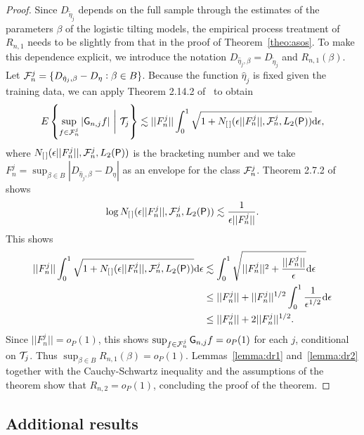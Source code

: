 \begin{proof}
  Since $D_{\tilde \eta_j}$ depends on the full sample through the
  estimates of the parameters $\beta$ of the logistic tilting models,
  the empirical process treatment of $R_{n,1}$ needs to be slightly
  from that in the proof of Theorem~\ref{theo:asos}. To make this
  dependence explicit, we introduce the notation
  $D_{\hat \eta_j,\beta}=D_{\tilde \eta_j}$ and $R_{n,1}(\beta)$. Let
  ${\cal F}_n^j=\{D_{\hat \eta_j,\beta} -
  D_\eta:\beta\in B\}$. Because the function
  $\hat\eta_j$ is fixed given the training data, we can apply Theorem
  2.14.2 of~\cite{vdvaart1996weak} to obtain
  \[E\left\{\sup_{f\in {\cal F}_n^j}|\Gnj f| \,\,\bigg|\,\, {\cal
        T}_j\right\}\lesssim ||F^j_n||\int_0^1\sqrt{1+N_{[\,]}(\epsilon
      ||F_n^j||, {\cal F}_n^j, L_2(\P))}\dd\epsilon, \] where
  $N_{[\,]}(\epsilon ||F_n^j||, {\cal F}_n^j, L_2(\P))$ is the
  bracketing number and we take
  $F_n^j=\sup_{\beta\in B}|D_{\hat \eta_j,\beta} -
  D_\eta|$ as an envelope for the class ${\cal
    F}_n^j$. Theorem 2.7.2 of~\cite{vdvaart1996weak} shows
  \[\log N_{[\,]}(\epsilon ||F_n^j||, {\cal F}_n^j, L_2(\P))\lesssim
    \frac{1}{\epsilon ||F_n^j||}.\]
  This shows
  \begin{align*}||F^j_n||\int_0^1\sqrt{1+N_{[\,]}(\epsilon
    ||F_n^j||, {\cal F}_n^j, L_2(\P))}\dd\epsilon &\lesssim
        \int_0^1\sqrt{||F^j_n||^2+\frac{||F^j_n||}{\epsilon}}\dd\epsilon\\
        &\leq
    ||F^j_n||+||F^j_n||^{1/2}\int_0^1\frac{1}{\epsilon^{1/2}}\dd\epsilon\\
        &\leq ||F^j_n|| + 2 ||F^j_n||^{1/2}.
  \end{align*}
  Since $||F^j_n||=o_P(1)$, this shows
  $\sup_{f\in {\cal F}_n^j}\Gnj f=o_P(1)$ for each $j$, conditional on
  ${\cal T}_j$. Thus $\sup_{\beta\in B} R_{n,1}(\beta)=o_P(1)$.
  Lemmas~\ref{lemma:dr1} and~\ref{lemma:dr2} together with the
  Cauchy-Schwartz inequality and the assumptions of the theorem show
  that $R_{n,2}=o_P(1)$, concluding the proof of the theorem.
\end{proof}

\subsection{Additional results}

